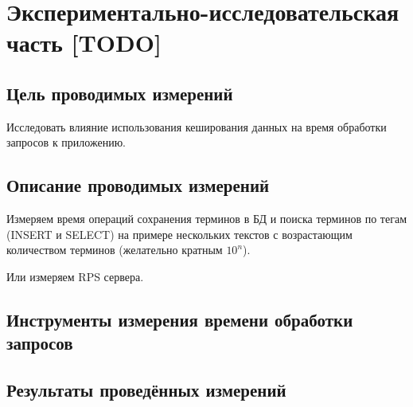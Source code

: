 \section{Экспериментально-исследовательская часть [TODO]}

\subsection{Цель проводимых измерений}

Исследовать влияние использования кеширования данных на время обработки запросов к приложению. 
	
\subsection{Описание проводимых измерений}

Измеряем время операций сохранения терминов в БД и поиска терминов по тегам (INSERT и SELECT) на примере нескольких текстов с возрастающим количеством терминов (желательно кратным $10^n$).

Или измеряем RPS сервера.
	
\subsection{Инструменты измерения времени обработки запросов}
		
\subsection{Результаты проведённых измерений}

\pagebreak